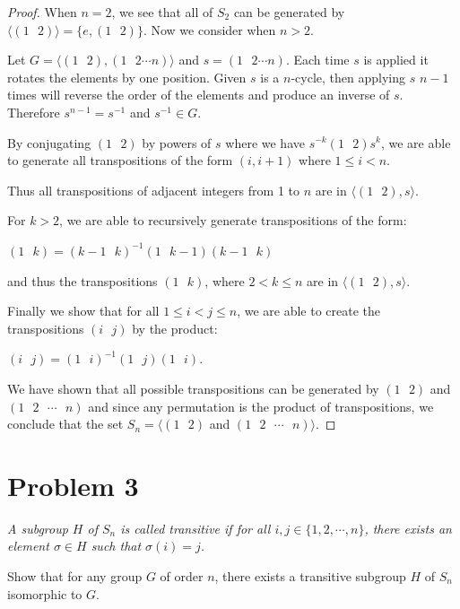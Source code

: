\documentclass{article}
\theoremstyle{plain} %
\theoremstyle{definition} %
\begin{document}
\begin{proof}
    When $n=2$, we see that all of $S_2$ can be generated by $ \langle (1\text{ }2)\rangle =\{e, (1\text{ }2)\}$. Now we consider when 
    $n > 2$.

    Let $G= \langle (1 \text{ }2), (1\text{ }2 \cdots n) \rangle$ and $s=(1\text{ }2\cdots n)$. Each time $s$ is applied it rotates the elements by one position. Given $s$ is a $n$-cycle, then applying $s$
    $n-1$ times will reverse the order of the elements and produce an inverse of $s$. Therefore $s^{n-1}=s^{-1}$ and $s^{-1} \in G$. 
    
    By conjugating $(1\text{ }2)$ by powers of $s$ where we have $s^{-k}(1\text{ }2)s^k$, 
    we are able to generate all transpositions of the form $(i, i+1)$ where $1 \leq i < n$.
    
    Thus all transpositions of adjacent integers from 1 to $n$ are in $\langle (1\text{ }2), s \rangle$.
    
    For $k > 2$, we are able to recursively generate transpositions of the form: 
    \begin{center}
        $(1\text { }k)=(k-1\text{ }k)^{-1}(1\text{ }k-1)(k-1\text{ }k)$
    \end{center}
    and thus the transpositions $(1\text{ }k)$, where $2 < k \leq n$ are in $\langle (1\text{ }2), s \rangle$.
    
    Finally we show that for all $1 \leq i < j \leq n$, we are able to
    create the transpositions $(i\text{ }j)$ by the product:
    \begin{center}
        $(i\text{ }j)=(1\text{ }i)^{-1}(1\text{ }j)(1\text{ }i)$.
    \end{center}
    We have shown that all possible transpositions can be generated by
    $(1\text{ }2)$ and $(1\text{ }2\text{ }\cdots\text{ }n)$ and since any permutation
    is the product of transpositions, we conclude that the set
    $S_n = \langle (1\text{ }2)$ and $(1\text{ }2\text{ }\cdots\text{ }n) \rangle $.
\end{proof}
    
    

\section*{Problem 3}
\noindent\textit{A subgroup $H$ of $S_n$ is called transitive if for all
$i,j \in \{1,2,\cdots,n\}$, there exists an element $\sigma \in H$ such that
$\sigma(i)=j$.}

\noindent{} Show that for any group $G$ of order $n$, there exists a transitive subgroup
$H$ of $S_n$ isomorphic to $G$.
\end{document}
